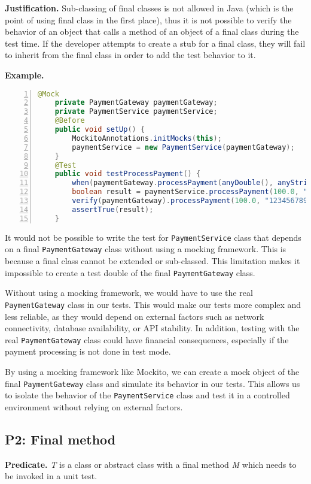\documentclass[conference]{IEEEtran}
\begin{document}
\textbf{Justification. }
Sub-classing of final classes is not allowed in Java (which is the point of using final class in the first place), thus it is not possible to verify the behavior of an object that calls a method of an object of a final class during the test time. If the developer attempts to create a stub for a final class, they will fail to inherit from the final class in order to add the test behavior to it. 

\textbf{Example. }
\begin{lstlisting}[basicstyle=\ttfamily,
numbers=left,numbersep=0pt,basicstyle=\scriptsize\ttfamily,language = Java, framesep=4.5mm, framexleftmargin=1.0mm, captionpos=b, escapechar=|, morekeywords={@Test}]
    @Mock
    private PaymentGateway paymentGateway;
    private PaymentService paymentService;
    @Before
    public void setUp() {
        MockitoAnnotations.initMocks(this);
        paymentService = new PaymentService(paymentGateway);
    }
    @Test
    public void testProcessPayment() {
        when(paymentGateway.processPayment(anyDouble(), anyString())).thenReturn(true);
        boolean result = paymentService.processPayment(100.0, "123456789");
        verify(paymentGateway).processPayment(100.0, "123456789");
        assertTrue(result);
    }
\end{lstlisting}

It would not be possible to write the test for \texttt{PaymentService} class that depends on a final \texttt{PaymentGateway} class without using a mocking framework. This is because a final class cannot be extended or sub-classed. This limitation makes it impossible to create a test double of the final \texttt{PaymentGateway} class.

Without using a mocking framework, we would have to use the real \texttt{PaymentGateway} class in our tests. This would make our tests more complex and less reliable, as they would depend on external factors such as network connectivity, database availability, or API stability. In addition, testing with the real \texttt{PaymentGateway} class could have financial consequences, especially if the payment processing is not done in test mode.

By using a mocking framework like Mockito, we can create a mock object of the final \texttt{PaymentGateway} class and simulate its behavior in our tests. This allows us to isolate the behavior of the \texttt{PaymentService} class and test it in a controlled environment without relying on external factors.

\subsection{P2: Final method}
\textbf{Predicate. }
\textit{T} is a class or abstract class with a final method \textit{M} which needs to be invoked in a unit test. 
\end{document}
